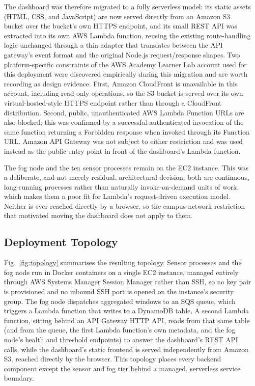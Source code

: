 \documentclass[conference]{IEEEtran}
\begin{document}
The dashboard was therefore migrated to a fully serverless model: its static assets (HTML, CSS, and JavaScript) are now served directly from an Amazon S3 bucket over the bucket's own HTTPS endpoint, and its small REST API was extracted into its own AWS Lambda function, reusing the existing route-handling logic unchanged through a thin adapter that translates between the API gateway's event format and the original Node.js request/response shapes. Two platform-specific constraints of the AWS Academy Learner Lab account used for this deployment were discovered empirically during this migration and are worth recording as design evidence. First, Amazon CloudFront is unavailable in this account, including read-only operations, so the S3 bucket is served over its own virtual-hosted-style HTTPS endpoint rather than through a CloudFront distribution. Second, public, unauthenticated AWS Lambda Function URLs are also blocked; this was confirmed by a successful authenticated invocation of the same function returning a Forbidden response when invoked through its Function URL. Amazon API Gateway \cite{ref15} was not subject to either restriction and was used instead as the public entry point in front of the dashboard's Lambda function.

The fog node and the ten sensor processes remain on the EC2 instance. This was a deliberate, and not merely residual, architectural decision: both are continuous, long-running processes rather than naturally invoke-on-demand units of work, which makes them a poor fit for Lambda's request-driven execution model. Neither is ever reached directly by a browser, so the campus-network restriction that motivated moving the dashboard does not apply to them.

\subsection{Deployment Topology}
Fig.~\ref{fig:topology} summarises the resulting topology. Sensor processes and the fog node run in Docker containers on a single EC2 instance, managed entirely through AWS Systems Manager Session Manager rather than SSH, so no key pair is provisioned and no inbound SSH port is opened on the instance's security group. The fog node dispatches aggregated windows to an SQS queue, which triggers a Lambda function that writes to a DynamoDB table. A second Lambda function, sitting behind an API Gateway HTTP API, reads from that same table (and from the queue, the first Lambda function's own metadata, and the fog node's health and threshold endpoints) to answer the dashboard's REST API calls, while the dashboard's static frontend is served independently from Amazon S3, reached directly by the browser. This topology places every backend component except the sensor and fog tier behind a managed, serverless service boundary.
\end{document}
